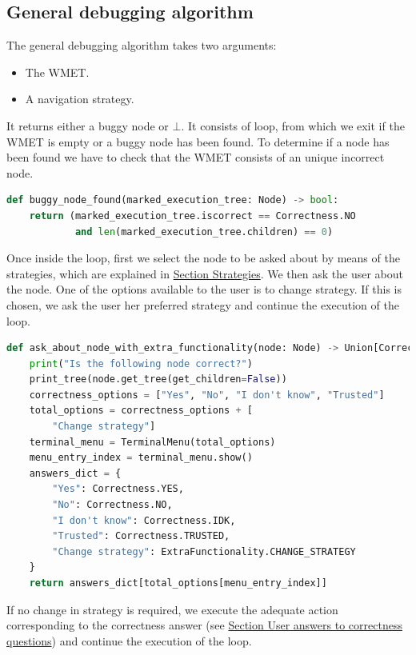 \subsection{General debugging algorithm}
The general debugging algorithm takes two arguments:
\begin{itemize}
    \item The WMET.
    \item A navigation strategy.
\end{itemize}
It returns either a buggy node or \(\bot\).
It consists of loop, from which we exit if the WMET is empty or a buggy node has been found.
To determine if a node has been found we have to check that the WMET consists of an unique incorrect node.
\begin{lstlisting}[language=Python, caption=How to determine if a buggy node has been found]
def buggy_node_found(marked_execution_tree: Node) -> bool:
    return (marked_execution_tree.iscorrect == Correctness.NO
            and len(marked_execution_tree.children) == 0)
\end{lstlisting}
Once inside the loop, first we select the node to be asked about by means of the strategies, which are explained in \hyperref[implementation:Strategies]{Section Strategies}.
We then ask the user about the node. One of the options available to the user is to change strategy. If this is chosen, we ask the user her preferred strategy and continue the execution of the loop.
\begin{lstlisting}[language=Python, caption=Function to ask about node]
def ask_about_node_with_extra_functionality(node: Node) -> Union[Correctness, ExtraFunctionality]:
    print("Is the following node correct?")
    print_tree(node.get_tree(get_children=False))
    correctness_options = ["Yes", "No", "I don't know", "Trusted"]
    total_options = correctness_options + [
        "Change strategy"]
    terminal_menu = TerminalMenu(total_options)
    menu_entry_index = terminal_menu.show()
    answers_dict = {
        "Yes": Correctness.YES,
        "No": Correctness.NO,
        "I don't know": Correctness.IDK,
        "Trusted": Correctness.TRUSTED,
        "Change strategy": ExtraFunctionality.CHANGE_STRATEGY
    }
    return answers_dict[total_options[menu_entry_index]]
\end{lstlisting}

If no change in strategy is required, we execute the adequate action corresponding to the correctness answer (see \hyperref[implementation:correctnessAnswers]{Section User answers to correctness questions}) and continue the execution of the loop.

